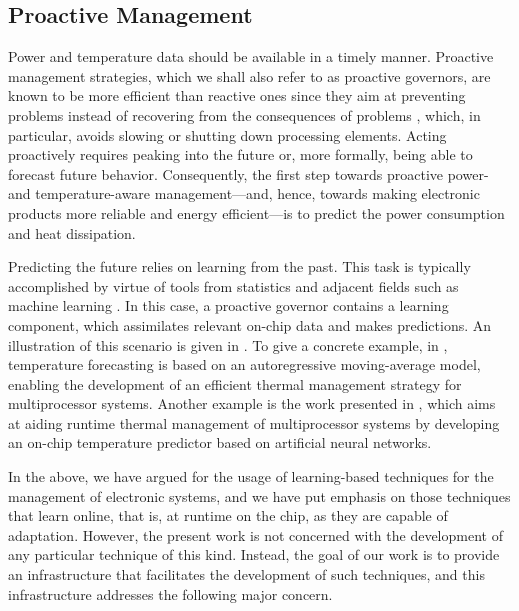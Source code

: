 \subsection{Proactive Management}

Power and temperature data should be available in a timely manner. Proactive
management strategies, which we shall also refer to as proactive governors, are
known to be more efficient than reactive ones since they aim at preventing
problems instead of recovering from the consequences of problems
\cite{coskun2008, chaudhry2015}, which, in particular, avoids slowing or
shutting down processing elements. Acting proactively requires peaking into the
future or, more formally, being able to forecast future behavior. Consequently,
the first step towards proactive power- and temperature-aware management---and,
hence, towards making electronic products more reliable and energy
efficient---is to predict the power consumption and heat dissipation.

Predicting the future relies on learning from the past. This task is typically
accomplished by virtue of tools from statistics and adjacent fields such as
machine learning \cite{bishop2006}. In this case, a proactive governor contains
a learning component, which assimilates relevant on-chip data and makes
predictions. An illustration of this scenario is given in . To
give a concrete example, in \cite{coskun2008}, temperature forecasting is based
on an autoregressive moving-average model, enabling the development of an
efficient thermal management strategy for multiprocessor systems. Another
example is the work presented in \cite{kumar2010}, which aims at aiding runtime
thermal management of multiprocessor systems by developing an on-chip
temperature predictor based on artificial neural networks.

In the above, we have argued for the usage of learning-based techniques for the
management of electronic systems, and we have put emphasis on those techniques
that learn online, that is, at runtime on the chip, as they are capable of
adaptation. However, the present work is not concerned with the development of
any particular technique of this kind. Instead, the goal of our work is to
provide an infrastructure that facilitates the development of such techniques,
and this infrastructure addresses the following major concern.

